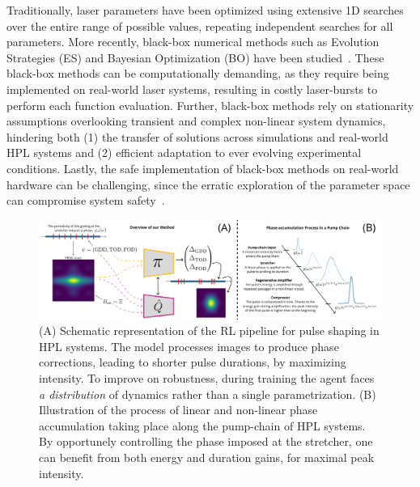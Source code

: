 Traditionally, laser parameters have been optimized using extensive 1D searches over the entire range of possible values, repeating independent searches for all parameters. 
More recently, black-box numerical methods such as Evolution Strategies (ES) and Bayesian Optimization (BO) have been studied~\citep{loughran2023automated, shalloo2020automation, arteaga2014supercontinuum}. 
These black-box methods can be computationally demanding, as they require being implemented on real-world laser systems, resulting in costly laser-bursts to perform each function evaluation. 
Further, black-box methods rely on stationarity assumptions overlooking transient and complex non-linear system dynamics, hindering both (1) the transfer of solutions across simulations and real-world HPL systems and (2) efficient adaptation to ever evolving experimental conditions.
Lastly, the safe implementation of black-box methods on real-world hardware can be challenging, since the erratic exploration of the parameter space can compromise system safety~\citep{capuano2023temporl}.

\begin{figure}
    \centering
    \includegraphics[width=\linewidth]{images/Figure1_and_CPA_edit_lowres.png}
    \caption{(A) Schematic representation of the RL pipeline for pulse shaping in HPL systems. The model processes images to produce phase corrections, leading to shorter pulse durations, by maximizing intensity. To improve on robustness, during training the agent faces \textit{a distribution} of dynamics rather than a single parametrization. (B) Illustration of the process of linear and non-linear phase accumulation taking place along the pump-chain of HPL systems. By opportunely controlling the phase imposed at the stretcher, one can benefit from both energy and duration gains, for maximal peak intensity.}
    \label{fig:figure1_and_cpa}
\end{figure}

